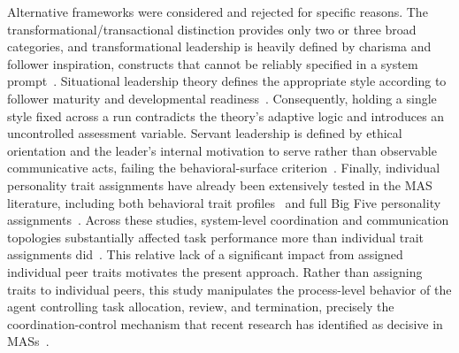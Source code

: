 Alternative frameworks were considered and rejected for specific reasons.
The transformational/transactional distinction provides only two or three broad categories, and transformational leadership is heavily defined by charisma and follower inspiration, constructs that cannot be reliably specified in a system prompt~\cite{judge2004transformationalleadership, khanin2007contrastingburnsandbass, kwak2026leadershipcoordinationcontrolbehavioral}.
Situational leadership theory defines the appropriate style according to follower maturity and developmental readiness~\cite{world6020063}. 
Consequently, holding a single style fixed across a run contradicts the theory's adaptive logic and introduces an uncontrolled assessment variable.
Servant leadership is defined by ethical orientation and the leader's internal motivation to serve rather than observable communicative acts, failing the behavioral-surface criterion~\cite{eva2019servantleadership}.
Finally, individual personality trait assignments have already been extensively tested in the \ac{MAS} literature, including both behavioral trait profiles~\cite{zhang2024exploringcollaborationmechanismsllm} and full Big Five personality assignments~\cite{duan2025powerpersonalityhumansimulation}.
Across these studies, system-level coordination and communication topologies substantially affected task performance more than individual trait assignments did~\cite{muralidharan2025lessonshumanteamsapplied, zhang2024cutcrapeconomicalcommunication}.
This relative lack of a significant impact from assigned individual peer traits motivates the present approach.
Rather than assigning traits to individual peers, this study manipulates the process-level behavior of the agent controlling task allocation, review, and termination, precisely the coordination-control mechanism that recent research has identified as decisive in \acp{MAS}~\cite{kwak2026leadershipcoordinationcontrolbehavioral, wang2025talkstructurallyacthierarchically}.

